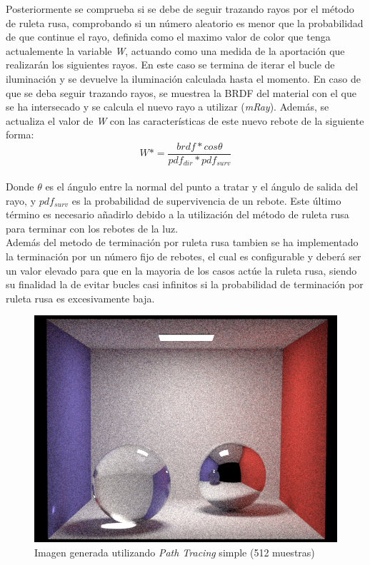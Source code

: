 \documentclass[10pt,oneside,a4paper]{article}
\begin{document}
Posteriormente se comprueba si se debe de seguir trazando rayos por el método de ruleta rusa, comprobando si un número aleatorio es menor que la probabilidad de que continue el rayo, definida como el maximo valor de color que tenga actualemente la variable \textit{W}, actuando como una medida de la aportación que realizarán los siguientes rayos. En este caso se termina de iterar el bucle de iluminación y se devuelve la iluminación calculada hasta el momento. En caso de que se deba seguir trazando rayos, se muestrea la BRDF del material con el que se ha intersecado y se calcula el nuevo rayo a utilizar (\textit{mRay}). Además, se actualiza el valor de \textit{W} con las características de este nuevo rebote de la siguiente forma:
$$W *= \frac{brdf * cos\theta}{pdf_{dir} * pdf_{surv}}$$\\

Donde $\theta$ es el ángulo entre la normal del punto a tratar y el ángulo de salida del rayo, y $pdf_{surv}$ es la probabilidad de supervivencia de un rebote. Este último término es necesario añadirlo debido a la utilización del método de ruleta rusa para terminar con los rebotes de la luz.\\

Además del metodo de terminación por ruleta rusa tambien se ha implementado la terminación por un número fijo de rebotes, el cual es configurable y deberá ser un valor elevado para que en la mayoria de los casos actúe la ruleta rusa, siendo su finalidad la de evitar bucles casi infinitos si la probabilidad de terminación por ruleta rusa es excesivamente baja.\\

\begin{figure}[h]
\centering
\includegraphics[width=.6\linewidth]{images/cbox_path_512.png}
\caption{Imagen generada utilizando \textit{Path Tracing} simple (512 muestras)}
\label{fig:disp}
\end{figure}
\end{document}
